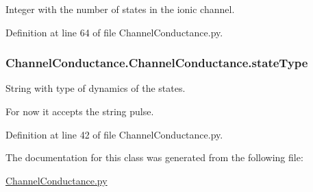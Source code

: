 Integer with the number of states in the ionic channel. 



Definition at line 64 of file Channel\-Conductance.\-py.

\hypertarget{class_channel_conductance_1_1_channel_conductance_aa3c889bb4528c3abe7b69862cf87119d}{
\subsubsection[{state\-Type}]{\setlength{\rightskip}{0pt plus 5cm}Channel\-Conductance.\-Channel\-Conductance.\-state\-Type}}\label{class_channel_conductance_1_1_channel_conductance_aa3c889bb4528c3abe7b69862cf87119d}


String with type of dynamics of the states. 

For now it accepts the string pulse. 

Definition at line 42 of file Channel\-Conductance.\-py.



The documentation for this class was generated from the following file\-:\begin{DoxyCompactItemize}
\item 
\hyperlink{_channel_conductance_8py}{Channel\-Conductance.\-py}\end{DoxyCompactItemize}

